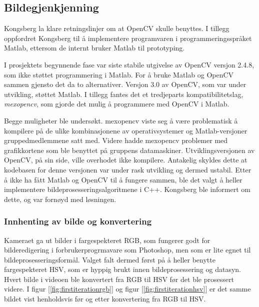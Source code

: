 \subsection{Bildegjenkjenning}

Kongsberg la klare retningslinjer om at OpenCV skulle benyttes. I tillegg oppfordret Kongsberg til å implementere programvaren i programmeringsspråket Matlab, ettersom de internt bruker Matlab til prototyping.

I prosjektets begynnende fase var siste stabile utgivelse av OpenCV versjon 2.4.8, som ikke støttet programmering i Matlab. For å bruke Matlab og OpenCV sammen gjensto det da to alternativer. Versjon 3.0 av OpenCV, som var under utvikling, støttet Matlab. I tillegg fantes det et tredjeparts kompatibilitetslag, \emph{mexopencv}, som gjorde det mulig å programmere med OpenCV i Matlab.

Begge muligheter ble undersøkt. mexopencv viste seg å være problematisk å kompilere på de ulike kombinasjonene av operativsystemer og Matlab-versjoner gruppedmedlemmene satt med. Videre hadde mexopencv problemer med grafikkortene som ble benyttet på gruppens datamaskiner. Utviklingsversjonen av OpenCV, på sin side, ville overhodet ikke kompilere. Antakelig skyldes dette at kodebasen for denne versjonen var under rask utvikling og dermed ustabil. Etter å ikke ha fått Matlab og OpenCV til å fungere sammen, ble det valgt å heller implementere bildeprosesseringsalgoritmene i C++. Kongsberg ble informert om dette, og var fornøyd med løsningen.

\subsubsection{Innhenting av bilde og konvertering}

Kameraet ga ut bilder i fargespekteret RGB, som fungerer godt for bilderedigering i forbrukerprogrmavare som Photoshop, men som er lite egnet til bildeprosesseringsformål. Valget falt dermed først på å heller benytte fargespekteret HSV, som er hyppig brukt innen bildeprosessering og datasyn. Hvert bilde i videoen ble konvertert fra RGB til HSV før det ble prosessert videre. I figur [\ref{fig:firstiterationrgb}] og figur [\ref{fig:firstiterationhsv}] er det samme bildet vist henholdsvis før og etter konvertering fra RGB til HSV.

